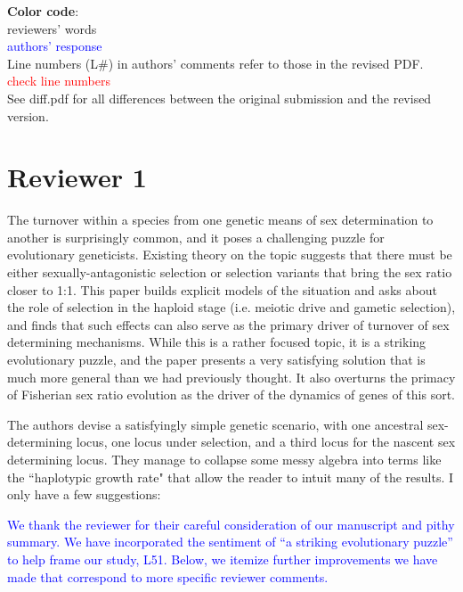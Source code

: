 \documentclass[10pt,letterpaper]{article}
\begin{document}
\noindent\textbf{Color code}:\\
reviewers' words\\
\textcolor{blue}{authors' response}
\\

\noindent  Line numbers (L\#) in authors' comments refer to those in the revised PDF.
\textcolor{red}{check line numbers}
\\

\noindent See diff.pdf for all differences between the original submission and the revised version.

\section{Reviewer 1}

The turnover within a species from one genetic means of sex determination to another is surprisingly common, and it poses a challenging puzzle for evolutionary geneticists.  Existing theory on the topic suggests that there must be either sexually-antagonistic selection or selection variants that bring the sex ratio closer to 1:1.  This paper builds explicit models of the situation and asks about the role of selection in the haploid stage (i.e. meiotic drive and gametic selection), and finds that such effects can also serve as the primary driver of turnover of sex determining mechanisms.  While this is a rather focused topic, it is a striking evolutionary puzzle, and the paper presents a very satisfying solution that is much more general than we had previously thought.  It also overturns the primacy of Fisherian sex ratio evolution as the driver of the dynamics of genes of this sort.

The authors devise a satisfyingly simple genetic scenario, with one ancestral sex-determining locus, one locus under selection, and a third locus for the nascent sex determining locus.  They manage to collapse some messy algebra into terms like the ``haplotypic growth rate" that allow the reader to intuit many of the results.  I only have a few suggestions:

\textcolor{blue}{
We thank the reviewer for their careful consideration of our manuscript and pithy summary. We have incorporated the sentiment of ``a striking evolutionary puzzle'' to help frame our study, L51. Below, we itemize further improvements we have made that correspond to more specific reviewer comments. 
}
\end{document}
